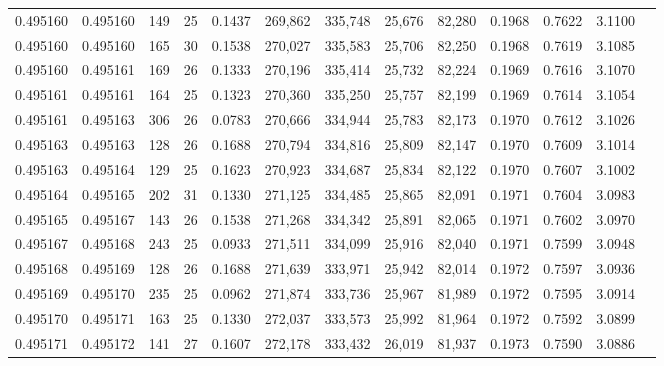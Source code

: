 \begin{tabular}{rrrrrrrrrrrrr}
0.495160 & 0.495160 & 149 &  25 &                                     0.1437 & 269,862 & 335,748 &  25,676 &  82,280 & 0.1968 & 0.7622 & 3.1100 \\
0.495160 & 0.495160 & 165 &  30 &                                     0.1538 & 270,027 & 335,583 &  25,706 &  82,250 & 0.1968 & 0.7619 & 3.1085 \\
0.495160 & 0.495161 & 169 &  26 &                                     0.1333 & 270,196 & 335,414 &  25,732 &  82,224 & 0.1969 & 0.7616 & 3.1070 \\
0.495161 & 0.495161 & 164 &  25 &                                     0.1323 & 270,360 & 335,250 &  25,757 &  82,199 & 0.1969 & 0.7614 & 3.1054 \\
0.495161 & 0.495163 & 306 &  26 &                                     0.0783 & 270,666 & 334,944 &  25,783 &  82,173 & 0.1970 & 0.7612 & 3.1026 \\
0.495163 & 0.495163 & 128 &  26 &                                     0.1688 & 270,794 & 334,816 &  25,809 &  82,147 & 0.1970 & 0.7609 & 3.1014 \\
0.495163 & 0.495164 & 129 &  25 &                                     0.1623 & 270,923 & 334,687 &  25,834 &  82,122 & 0.1970 & 0.7607 & 3.1002 \\
0.495164 & 0.495165 & 202 &  31 &                                     0.1330 & 271,125 & 334,485 &  25,865 &  82,091 & 0.1971 & 0.7604 & 3.0983 \\
0.495165 & 0.495167 & 143 &  26 &                                     0.1538 & 271,268 & 334,342 &  25,891 &  82,065 & 0.1971 & 0.7602 & 3.0970 \\
0.495167 & 0.495168 & 243 &  25 &                                     0.0933 & 271,511 & 334,099 &  25,916 &  82,040 & 0.1971 & 0.7599 & 3.0948 \\
0.495168 & 0.495169 & 128 &  26 &                                     0.1688 & 271,639 & 333,971 &  25,942 &  82,014 & 0.1972 & 0.7597 & 3.0936 \\
0.495169 & 0.495170 & 235 &  25 &                                     0.0962 & 271,874 & 333,736 &  25,967 &  81,989 & 0.1972 & 0.7595 & 3.0914 \\
0.495170 & 0.495171 & 163 &  25 &                                     0.1330 & 272,037 & 333,573 &  25,992 &  81,964 & 0.1972 & 0.7592 & 3.0899 \\
0.495171 & 0.495172 & 141 &  27 &                                     0.1607 & 272,178 & 333,432 &  26,019 &  81,937 & 0.1973 & 0.7590 & 3.0886 \\

\end{tabular}

